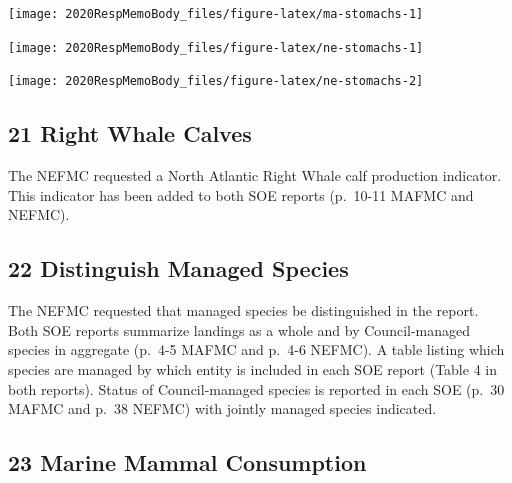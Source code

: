\documentclass[
  10pt,
]{article}
\let\origfigure\figure
\let\endorigfigure\endfigure
\renewenvironment{figure}[1][2] {
    \expandafter\origfigure\expandafter[H]
} {
    \endorigfigure
}
\begin{document}
\begin{figure}

{\centering \texttt{[image: 2020RespMemoBody\_files/figure-latex/ma-stomachs-1]} 

}

\caption{Stomach fullness anomaly in the Mid-Atlantic Bight.}\label{fig:ma-stomachs}
\end{figure}

\begin{figure}

{\centering \texttt{[image: 2020RespMemoBody\_files/figure-latex/ne-stomachs-1]} 

}

\caption{ Stomach Fullness Anomaly in New England.}\label{fig:ne-stomachs1}
\end{figure}
\begin{figure}

{\centering \texttt{[image: 2020RespMemoBody\_files/figure-latex/ne-stomachs-2]} 

}

\caption{ Stomach Fullness Anomaly in New England.}\label{fig:ne-stomachs2}
\end{figure}

\hypertarget{right-whale-calves}{%
\subsection{21 Right Whale Calves}\label{right-whale-calves}}

The NEFMC requested a North Atlantic Right Whale calf production
indicator. This indicator has been added to both SOE reports (p.~10-11
MAFMC and NEFMC).

\hypertarget{distinguish-managed-species}{%
\subsection{22 Distinguish Managed
Species}\label{distinguish-managed-species}}

The NEFMC requested that managed species be distinguished in the report.
Both SOE reports summarize landings as a whole and by Council-managed
species in aggregate (p.~4-5 MAFMC and p.~4-6 NEFMC). A table listing
which species are managed by which entity is included in each SOE report
(Table 4 in both reports). Status of Council-managed species is reported
in each SOE (p.~30 MAFMC and p.~38 NEFMC) with jointly managed species
indicated.

\hypertarget{marine-mammal-consumption}{%
\subsection{23 Marine Mammal
Consumption}\label{marine-mammal-consumption}}
\end{document}
